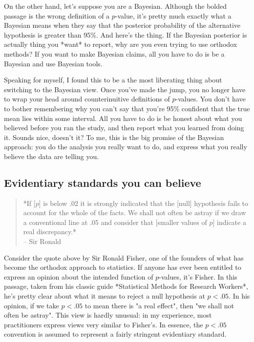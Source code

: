 On the other hand, let's suppose you are a Bayesian. Although the bolded passage is the wrong definition of a $p$-value, it's pretty much exactly what a Bayesian means when they say that the posterior probability of the alternative hypothesis is greater than 95\%. And here's the thing. If the Bayesian posterior is actually thing you *want* to report, why are you even trying to use orthodox methods? If you want to make Bayesian claims, all you have to do is be a Bayesian and use Bayesian tools. 

Speaking for myself, I found this to be a the most liberating thing about switching to the Bayesian view. Once you've made the jump, you no longer have to wrap your head around counterinuitive definitions of $p$-values. You don't have to bother remembering why you can't say that you're 95\% confident that the true mean lies within some interval. All you have to do is be honest about what you believed before you ran the study, and then report what you learned from doing it. Sounds nice, doesn't it? To me, this is the big promise of the Bayesian approach: you do the analysis you really want to do, and express what you really believe the data are telling you.



\subsection{Evidentiary standards you can believe}



\begin{quote}
*If [$p$] is below .02 it is strongly indicated that the [null] hypothesis fails to account for the whole of the facts. We shall not often be astray if we draw a conventional line at .05 and consider that [smaller values of $p$] indicate a real discrepancy.*\\
\hspace*{2cm} -- Sir Ronald 
\end{quote}


Consider the quote above by Sir Ronald Fisher, one of the founders of what has become the orthodox approach to statistics. If anyone has ever been entitled to express an opinion about the intended function of $p$-values, it's Fisher. In this passage, taken from his classic guide *Statistical Methods for Research Workers*, he's pretty clear about what it means to reject a null hypothesis at $p<.05$. In his opinion, if we take $p<.05$ to mean there is "a real effect", then "we shall not often be astray". This view is hardly unusual: in my experience, most practitioners express views very similar to Fisher's. In essence, the $p<.05$ convention is assumed to represent a fairly stringent evidentiary standard.

